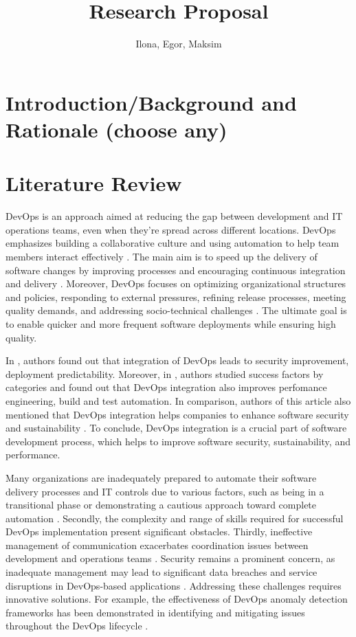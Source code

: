 \documentclass[oneside,final,12pt,a4paper]{extreport}
\title{Research Proposal}
\author{Ilona, Egor, Maksim}
\affil{Innopolis University}
\begin{document}
\maketitle

\newpage

\section{Introduction/Background and Rationale (choose any)}



\section{Literature Review}

DevOps is an approach aimed at reducing the gap between development and IT operations teams, even when they're spread across different locations. DevOps emphasizes building a collaborative culture and using automation to help team members interact effectively \cite{7}. The main aim is to speed up the delivery of software changes by improving processes and encouraging continuous integration and delivery \cite{11}. Moreover, DevOps focuses on optimizing organizational structures and policies, responding to external pressures, refining release processes, meeting quality demands, and addressing socio-technical challenges \cite{7}. The ultimate goal is to enable quicker and more frequent software deployments while ensuring high quality.

In \cite{7}, authors found out that integration of DevOps leads to security improvement, deployment predictability. Moreover, in \cite{9}, authors studied success factors by categories and found out that DevOps integration also improves perfomance engineering, build and test automation. In comparison, authors of this article also mentioned that DevOps integration helps companies to enhance software security and sustainability \cite{12}\cite{18}. To conclude, DevOps integration is a crucial part of software development process, which helps to improve software security, sustainability, and performance.

Many organizations are inadequately prepared to automate their software delivery processes and IT controls due to various factors, such as being in a transitional phase or demonstrating a cautious approach toward complete automation \cite{12}. Secondly, the complexity and range of skills required for successful DevOps implementation present significant obstacles. Thirdly, ineffective management of communication exacerbates coordination issues between development and operations teams \cite{7}. Security remains a prominent concern, as inadequate management may lead to significant data breaches and service disruptions in DevOps-based applications \cite{14}. Addressing these challenges requires innovative solutions. For example, the effectiveness of DevOps anomaly detection frameworks has been demonstrated in identifying and mitigating issues throughout the DevOps lifecycle \cite{13}.
\end{document}
